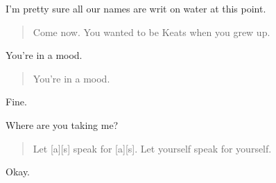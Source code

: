 I'm pretty sure all our names are writ on water at this point.

\begin{quote}
Come now. You wanted to be Keats when you grew up.
\end{quote}

You're in a mood.

\begin{quote}
You're in a mood.
\end{quote}

Fine.

Where are you taking me?

\begin{quote}
Let {[}a{]}{[}s{]} speak for {[}a{]}{[}s{]}. Let yourself speak for yourself.
\end{quote}

Okay.

